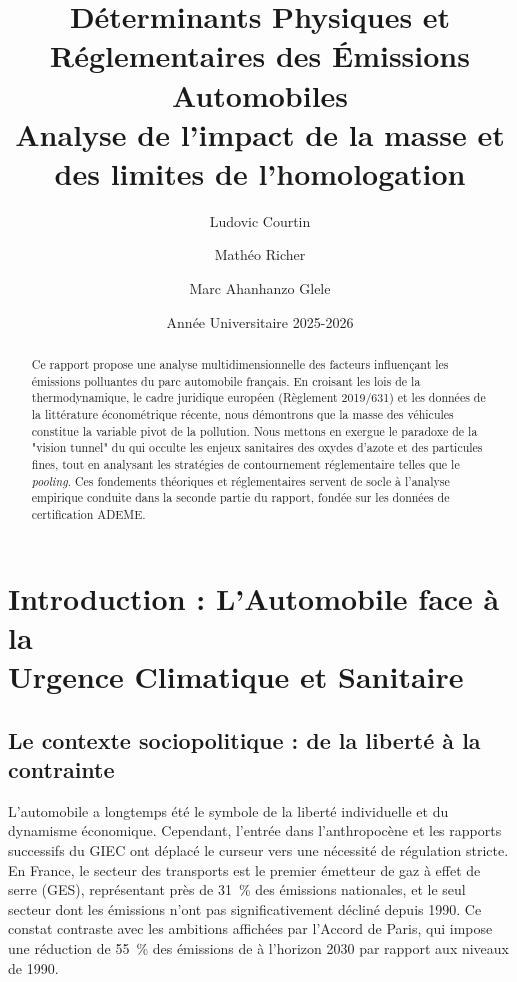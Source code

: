 \documentclass[12pt, a4paper]{article}
\title{\textbf{Déterminants Physiques et Réglementaires des Émissions Automobiles} \\ \large Analyse de l'impact de la masse et des limites de l'homologation}
\author{Ludovic Courtin \and Mathéo Richer \and Marc Ahanhanzo Glele}
\date{Année Universitaire 2025-2026}
\begin{document}
\maketitle

\begin{abstract}
Ce rapport propose une analyse multidimensionnelle des facteurs influençant les émissions polluantes du parc automobile français. En croisant les lois de la thermodynamique, le cadre juridique européen (Règlement 2019/631) et les données de la littérature économétrique récente, nous démontrons que la masse des véhicules constitue la variable pivot de la pollution. Nous mettons en exergue le paradoxe de la "vision tunnel" du  qui occulte les enjeux sanitaires des oxydes d'azote et des particules fines, tout en analysant les stratégies de contournement réglementaire telles que le \textit{pooling}. Ces fondements théoriques et réglementaires servent de socle à l'analyse empirique conduite dans la seconde partie du rapport, fondée sur les données de certification ADEME.
\end{abstract}

\tableofcontents
\newpage

\section[Introduction : L'Automobile face à l'Urgence Climatique]{Introduction : L'Automobile face à la\\Urgence Climatique et Sanitaire}

\subsection{Le contexte sociopolitique : de la liberté à la contrainte}

L'automobile a longtemps été le symbole de la liberté individuelle et du dynamisme économique. Cependant, l'entrée dans l'anthropocène et les rapports successifs du GIEC ont déplacé le curseur vers une nécessité de régulation stricte. En France, le secteur des transports est le premier émetteur de gaz à effet de serre (GES), représentant près de \SI{31}{\percent} des émissions nationales, et le seul secteur dont les émissions n'ont pas significativement décliné depuis 1990. Ce constat contraste avec les ambitions affichées par l'Accord de Paris, qui impose une réduction de \SI{55}{\percent} des émissions de  à l'horizon 2030 par rapport aux niveaux de 1990.
\end{document}
